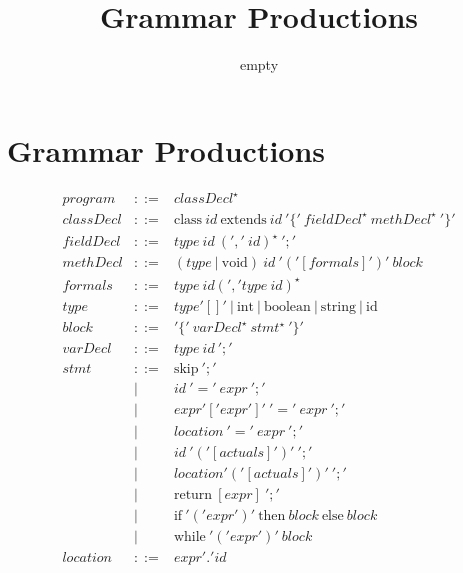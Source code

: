 \documentclass{article}
\title{Grammar Productions}
\author{empty}
\begin{document}
\maketitle %

%	

\section{Grammar Productions}
$$
\begin{array}{rcl}
 program & ::= & classDecl ^{\star} \\
 classDecl & ::= & \textrm{class} ~id~ \textrm{extends} ~id~ '\{'~ fieldDecl^{\star}~  methDecl^{\star} ~'\}'  \\
 fieldDecl & ::= & type~id ~(',' ~id)^{\star} ~';' \\
 methDecl & ::= & (type~|~\textrm{void})~id~ '('[formals]')'~ block \\
 formals & ::= & type~id (',' type~id)^{\star} \\
 type & ::= & type'[]'~|~\textrm{int}~|~\textrm{boolean}~|~\textrm{string}~|~\textrm{id}\\
 block & ::= & '\{'~varDecl^{\star} ~stmt^{\star}~'\}' \\
 varDecl & ::= & type~id ~';' \\
 stmt & ::= & \textrm{skip} ~';'\\
 & | & id ~'='~ expr ~';'\\
 & | & expr '[' expr ']' ~'='~ expr ~';'\\
 & | & location ~'='~ expr ~';'\\
 & | & id~'('[actuals]')'~';'\\
 & | & location'('[actuals]')'~';'\\
 & | & \textrm{return} ~[expr] ~';'\\
 & | & \textrm{if} ~'('expr')' ~\textrm{then} ~block ~\textrm{else} ~block \\
 & | & \textrm{while} ~'('expr')' ~block\\
 location & ::= & expr'.'id\\

\end{array}$$
\end{document}
